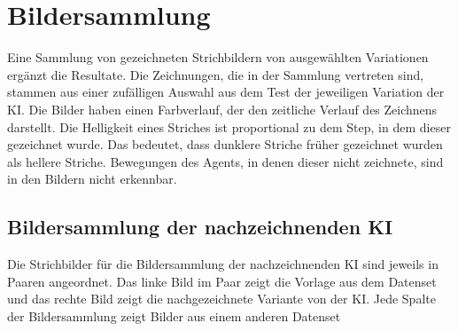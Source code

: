 \section{Bildersammlung}\label{chap:r_bild} Eine Sammlung von gezeichneten
Strichbildern von ausgewählten Variationen ergänzt die Resultate. Die Zeichnungen, die in der Sammlung
vertreten sind, stammen aus einer zufälligen Auswahl aus dem Test der jeweiligen
Variation der KI. Die Bilder haben einen Farbverlauf, der den zeitliche Verlauf
des Zeichnens darstellt. Die Helligkeit eines Striches ist proportional zu dem
Step, in dem dieser gezeichnet wurde. Das bedeutet, dass dunklere Striche früher
gezeichnet wurden als hellere Striche. Bewegungen des Agents, in denen dieser
nicht zeichnete, sind in den Bildern nicht erkennbar.


\subsection{Bildersammlung der nachzeichnenden KI}\label{sub:r_bild_nach}

Die Strichbilder für die Bildersammlung der nachzeichnenden KI sind jeweils in Paaren
angeordnet. Das linke Bild im Paar zeigt die Vorlage aus dem Datenset und das
rechte Bild zeigt die nachgezeichnete Variante von der KI. Jede Spalte der
Bildersammlung zeigt Bilder aus einem anderen Datenset

